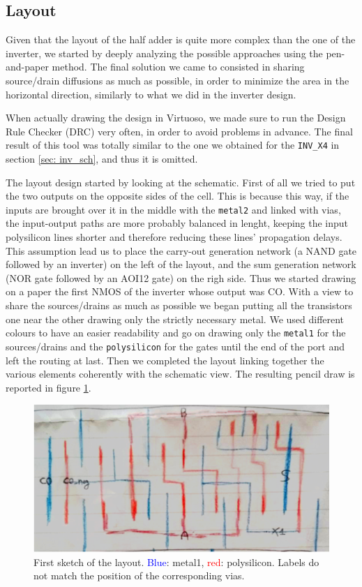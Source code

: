 \documentclass[a4paper]{article}
\newcommand{\inv}{\texttt{INV\_X4}\xspace}
\begin{document}
\subsection{Layout}
Given that the layout of the half adder is quite more complex than the one of the inverter, we started by deeply analyzing the possible approaches using the pen-and-paper method. The final solution we came to consisted in sharing source/drain diffusions as much as possible, in order to minimize the area in the horizontal direction, similarly to what we did in the inverter design.

When actually drawing the design in Virtuoso, we made sure to run the Design Rule Checker (DRC) very often, in order to avoid problems in advance. The final result of this tool was totally similar to the one we obtained for the \inv in section \ref{sec: inv_sch}, and thus it is omitted.

The layout design started by looking at the schematic. First of all we tried to put the two outputs on the opposite sides of the cell. This is because this way, if the inputs are brought over it in the middle with the \texttt{metal2} and linked with vias, the input-output paths are more probably balanced in lenght, keeping the input polysilicon lines shorter and therefore reducing these lines' propagation delays. This assumption lead us to place the carry-out generation network (a NAND gate followed by an inverter) on the left of the layout, and the sum generation network (NOR gate followed by an AOI12 gate) on the righ side.
Thus we started drawing on a paper the first NMOS of the inverter whose output was CO. With a view to share the sources/drains as much as possible we began putting all the transistors one near the other drawing only the strictly necessary metal.
We used different colours to have an easier readability and go on drawing only the \texttt{metal1} for the sources/drains and the \texttt{polysilicon} for the gates until the end of the port and left the routing at last. Then we completed the layout linking together the various elements coherently with the schematic view. The resulting pencil draw is reported in figure \ref{fig: lay_drw}.

\begin{figure}[H]
      \centering
      \includegraphics[width=0.8\linewidth]{./Images/HA/layout_drw.png}
	  \caption{First sketch of the layout. \textcolor{blue}{Blue}: metal1, \textcolor{red}{red}: polysilicon. Labels do not match the position of the corresponding vias.}
	  \label{fig: lay_drw}
\end{figure}
\end{document}
